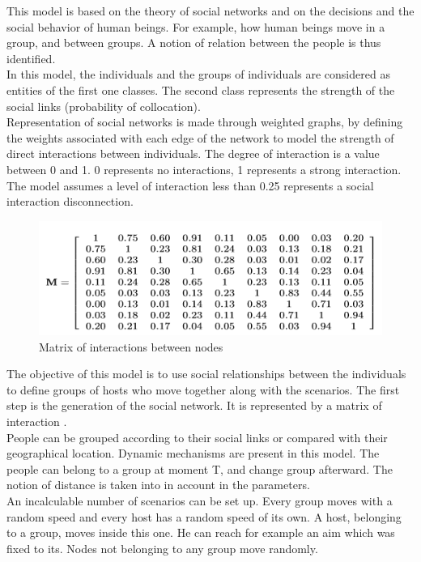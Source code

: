 This model is based on the theory of social networks and on the decisions and the social behavior of human beings. For example, how human beings move in a group, and between groups. A notion of relation between the people is thus identified.\\
In this model, the individuals and the groups of individuals are considered as entities of the first one classes. The second class represents the strength of the social links (probability of collocation).\\

Representation of social networks is made through weighted graphs, by defining the weights associated with each edge of the network to model the strength of direct interactions between individuals. The degree of interaction is a value between 0 and 1. 0 represents no interactions, 1 represents a strong interaction.
The model assumes a level of interaction less than 0.25 represents a social interaction disconnection.\\

\begin{figure}[h]
\center
\includegraphics{../images/MatrixInteractionSocialNetwork.png}
\caption{\label{MatricSN}Matrix of interactions between nodes}
\label{MatricSN}
\end{figure}

The objective of this model is to use social relationships between the individuals to define groups of hosts who move together along with the scenarios.
The first step is the generation of the social network. It is represented by a matrix of interaction \pageref{MatricSN}.\\

People can be grouped according to their social links or compared with their geographical location. Dynamic mechanisms are present in this model. The people can belong to a group at moment T, and change group afterward. The notion of distance is taken into in account in the parameters.\\
An incalculable number of scenarios can be set up. Every group moves with a random speed and every host has a random speed of its own. A host, belonging to a group, moves inside this one. He can reach for example an aim which was fixed to its. Nodes not belonging to any group move randomly.\\

